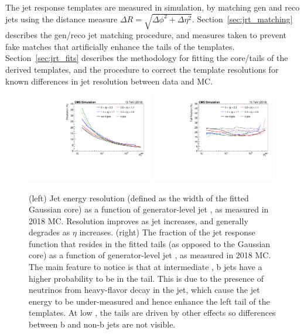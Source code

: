 The jet response templates are measured in simulation, by matching gen and reco jets
using the distance measure $\Delta R = \sqrt{\Delta\phi^2+\Delta\eta^2}$.
Section~\ref{sec:jrt_matching} describes the gen/reco jet matching procedure, 
and measures taken to prevent fake matches that artificially enhance the tails of the templates.
Section~\ref{sec:jrt_fits} describes the methodology for fitting the core/tails of the
derived templates, and the procedure to correct the template resolutions for known
differences in jet resolution between data and MC.

\begin{figure}[t!]
  \begin{center}
    \includegraphics[width=0.49\textwidth]{figs/jetmet/resolution_vs_pt.pdf}
    \includegraphics[width=0.49\textwidth]{figs/jetmet/tailfrac_vs_pt.pdf}
    \caption{(left) Jet energy resolution (defined as the width of the fitted Gaussian core) as a function of generator-level jet \pt, as measured in 2018 MC. 
    Resolution improves as jet \pt increases, and generally degrades as $\eta$ increases.
    (right) The fraction of the jet response function that resides in the fitted tails (as opposed to the Gaussian core) as a function of generator-level jet \pt, 
    as measured in 2018 MC. The main feature to notice is that at intermediate \pt,  b jets have a higher probability to be in the tail. This is due to the presence
    of neutrinos from heavy-flavor decay in the jet, which cause the jet energy to be under-measured and hence enhance the left tail of the templates. At low \pt, the
    tails are driven by other effects so differences between b and non-b jets are not visible.
    }
    \label{fig:jrt_res_pt}
  \end{center}
\end{figure}


